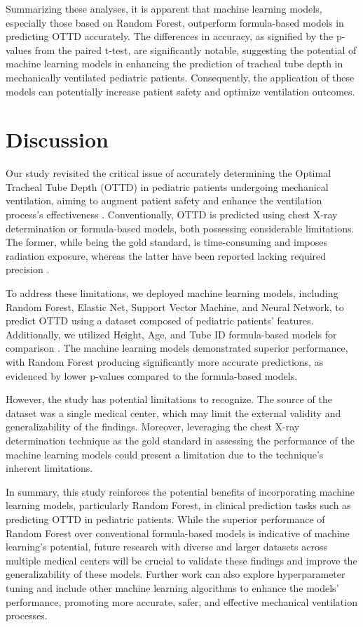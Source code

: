 \documentclass[11pt]{article}
\begin{document}
Summarizing these analyses, it is apparent that machine learning models, especially those based on Random Forest, outperform formula-based models in predicting OTTD accurately. The differences in accuracy, as signified by the p-values from the paired t-test, are significantly notable, suggesting the potential of machine learning models in enhancing the prediction of tracheal tube depth in mechanically ventilated pediatric patients. Consequently, the application of these models can potentially increase patient safety and optimize ventilation outcomes.

\section*{Discussion}

Our study revisited the critical issue of accurately determining the Optimal Tracheal Tube Depth (OTTD) in pediatric patients undergoing mechanical ventilation, aiming to augment patient safety and enhance the ventilation process's effectiveness \cite{Kollef1994EndotrachealTM}. Conventionally, OTTD is predicted using chest X-ray determination or formula-based models, both possessing considerable limitations. The former, while being the gold standard, is time-consuming and imposes radiation exposure, whereas the latter have been reported lacking required precision \cite{Cook2005ThePL, Matava2020PediatricAM}. 

To address these limitations, we deployed machine learning models, including Random Forest, Elastic Net, Support Vector Machine, and Neural Network, to predict OTTD using a dataset composed of pediatric patients' features. Additionally, we utilized Height, Age, and Tube ID formula-based models for comparison \cite{Alexander2017AnOR}. The machine learning models demonstrated superior performance, with Random Forest producing significantly more accurate predictions, as evidenced by lower p-values compared to the formula-based models. 

However, the study has potential limitations to recognize. The source of the dataset was a single medical center, which may limit the external validity and generalizability of the findings. Moreover, leveraging the chest X-ray determination technique as the gold standard in assessing the performance of the machine learning models could present a limitation due to the technique's inherent limitations.

In summary, this study reinforces the potential benefits of incorporating machine learning models, particularly Random Forest, in clinical prediction tasks such as predicting OTTD in pediatric patients. While the superior performance of Random Forest over conventional formula-based models is indicative of machine learning's potential, future research with diverse and larger datasets across multiple medical centers will be crucial to validate these findings and improve the generalizability of these models. Further work can also explore hyperparameter tuning and include other machine learning algorithms to enhance the models' performance, promoting more accurate, safer, and effective mechanical ventilation processes.
\end{document}
